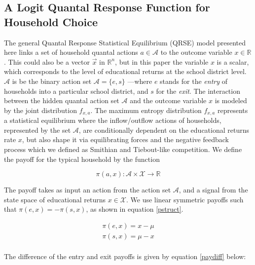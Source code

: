 \subsection{A Logit Quantal Response Function for Household Choice}
\label{sec-4-2}

The general Quantal Response Statistical Equilibrium (QRSE) model
presented here links a set of household quantal actions $a \in
\mathcal{A}$ to the outcome variable $x \in \mathbb{R}$. This could
also be a vector $\vec{x}$ in $\mathbb{R}^{n}$, but in this paper the
variable $x$ is a scalar, which corresponds to the level of
educational returns at the school district level. $\mathcal{A}$ is be
the binary action set $\mathcal{A} = \{e, s \}$ —where $e$ stands for the
\emph{entry} of households into a particular school district, and $s$ for
the \emph{exit}. The interaction between the hidden quantal action set
$\mathcal{A}$ and the outcome variable $x$ is modeled by the joint
distribution $f_{x,a}$.  The maximum entropy distribution $f_{x,a}$
represents a statistical equilibrium where the inflow/outflow actions
of households, represented by the set $\mathcal{A}$, are conditionally
dependent on the educational returns rate $x$, but also shape it via
equilibrating forces and the negative feedback process which we
defined as Smithian and Tiebout-like competition. We define the payoff for the typical household by the function 

\medskip

\begin{equation}\label{payoff} 
\pi(a, x): \mathcal{A}\times \mathcal{X} \rightarrow \mathbb{R}  
\end{equation}

\medskip

The payoff takes as input an action from the action set $\mathcal{A}$,
and a signal from the state space of educational returns $x \in
\mathcal{X}$.  We use linear symmetric payoffs such that $\pi(e,x) =
-\pi(s,x)$, as shown in equation \ref{pstruct}. 

\medskip 

\begin{equation} \label{pstruct}
\begin{aligned}
\pi(e,x) = x -\mu \\
\pi(s,x) = \mu - x \\
\end{aligned}
\end{equation}


\medskip 

The difference of the entry and exit payoffs is given by equation
\ref{paydiff} below:

